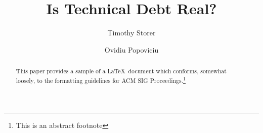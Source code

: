 \documentclass[sigconf]{acmart}
\begin{document}
\title{Is Technical Debt Real?}


\author{Timothy Storer}
\email{}

\author{Ovidiu Popoviciu}
\email{}




\begin{abstract}
This paper provides a sample of a \LaTeX\ document which conforms,
somewhat loosely, to the formatting guidelines for
ACM SIG Proceedings.\footnote{This is an abstract footnote}
\end{abstract}

%
%







\maketitle





\end{document}
